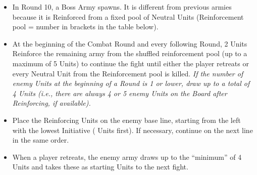 \begin{multicols}{2}
\begin{itemize}
  \item In Round 10, a Boss Army spawns. It is different from previous armies because it is Reinforced from a fixed pool of Neutral Units (Reinforcement pool = number in brackets in the table below).
  \item At the beginning of the  Combat Round and every following Round, 2 Units Reinforce the remaining army from the shuffled reinforcement pool (up to a maximum of 5 Units) to continue the fight until either the player retreats or every Neutral Unit from the Reinforcement pool is killed. \textit{If the number of enemy Units at the beginning of a Round is 1 or lower, draw up to a total of 4 Units (i.e., there are always 4 or 5 enemy Units on the Board after Reinforcing, if available).}
  \item Place the Reinforcing Units on the enemy base line, starting from the left with the lowest Initiative ( Units first). If necessary, continue on the next line in the same order.
  \item When a player retreats, the enemy army draws up to the ``minimum'' of 4 Units and takes these as starting Units to the next fight.
\end{itemize}

\columnbreak

\vspace*{\fill}

\end{multicols}


\vspace*{\fill}

